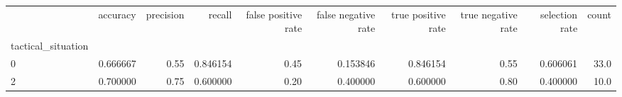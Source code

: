 \begin{tabular}{lrrrrrrrrr}
\toprule
{} &  accuracy &  precision &    recall &  false positive rate &  false negative rate &  true positive rate &  true negative rate &  selection rate &  count \\
tactical\_situation &           &            &           &                      &                      &                     &                     &                 &        \\
\midrule
0                  &  0.666667 &       0.55 &  0.846154 &                 0.45 &             0.153846 &            0.846154 &                0.55 &        0.606061 &   33.0 \\
2                  &  0.700000 &       0.75 &  0.600000 &                 0.20 &             0.400000 &            0.600000 &                0.80 &        0.400000 &   10.0 \\
\bottomrule
\end{tabular}
